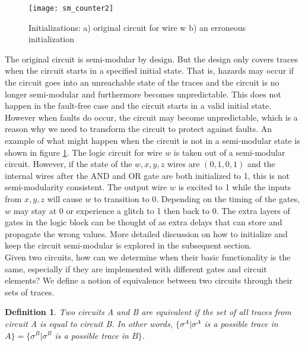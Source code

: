 \documentclass[12pt]{report}
\newtheorem*{definition}{Definition}
\begin{document}
\begin{figure}
  \centering
    \texttt{[image: sm\_counter2]}
  \caption[Initializations]{Initializations: a) original circuit for wire w b) an erroneous initialization}
  \label{fig:sm_counter2}
\end{figure}

The original circuit is semi-modular by design.  But the design only covers traces when the circuit starts in a specified initial state.  That is, hazards may occur if the circuit goes into an unreachable state of the traces and the circuit is no longer semi-modular and furthermore becomes unpredictable.  This does not happen in the fault-free case and the circuit starts in a valid initial state.  However when faults do occur, the circuit may become unpredictable, which is a reason why we need to transform the circuit to protect against faults.  An example of what might happen when the circuit is not in a semi-modular state is shown in figure \ref{fig:sm_counter2}.  The logic circuit for wire $w$ is taken out of a semi-modular circuit.  However, if the state of the $w,x,y,z$ wires are $(0,1,0,1)$ and the internal wires after the AND and OR gate are both initialized to 1, this is not semi-modularity consistent.  The output wire $w$ is excited to 1 while the inputs from $x,y,z$ will cause $w$ to transition to 0.  Depending on the timing of the gates, $w$ may stay at 0 or experience a glitch to 1 then back to 0.  The extra layers of gates in the logic block can be thought of as extra delays that can store and propagate the wrong values.  More detailed discussion on how to initialize and keep the circuit semi-modular is explored in the subsequent section.\\

Given two circuits, how can we determine when their basic functionality is the same, especially if they are implemented with different gates and circuit elements?  We define a notion of equivalence between two circuits through their sets of traces.  
\begin{definition} Two circuits A and B are {\em equivalent} if the set of all traces from circuit A is equal to circuit B.  In other words, $\{\sigma^A |\sigma^A$ is a possible trace in $A\}=\{\sigma^B |\sigma^B$ is a possible trace in $B\}$.
\end{definition}
\end{document}
